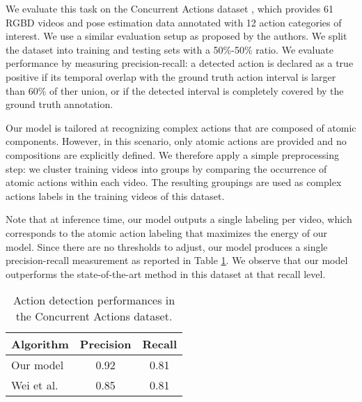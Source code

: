 We evaluate this task on the Concurrent Actions dataset \cite{Wei2013},
which
provides 61 RGBD videos and pose estimation data annotated with 12
action categories of interest.
We use a similar evaluation setup as proposed by the authors.
We split the dataset into training and testing sets with a 50\%-50\% ratio.
We evaluate performance by measuring precision-recall: a detected action
is declared as a true positive if its temporal overlap with the ground
truth action interval is larger than 60\% of ther union, or if
the detected interval is completely covered by the ground truth annotation.

Our model is tailored at recognizing complex actions that are composed
of atomic components. However, in this scenario, only atomic actions are
provided and no compositions are explicitly defined. We therefore apply
a simple preprocessing step: we cluster training videos into groups
by comparing the occurrence of atomic actions within each video.
The resulting groupings are used as complex actions labels in the training
videos of this dataset.

Note that at inference time, our model outputs a single labeling per video,
which corresponds to the atomic action labeling that maximizes the energy of
our model.
Since there are no thresholds to adjust, our model produces a single
precision-recall measurement as reported in Table \ref{tab:concurrent}.
We observe that our model outperforms the state-of-the-art method in this
dataset at that recall level.





\begin{table}
\footnotesize
\centering
\begin{tabular}{|l|c|c|}
\hline
\textbf{Algorithm} & \textbf{Precision} & \textbf{Recall}\\
\hline
Our model &  0.92 & 0.81 \\
\hline
Wei et al. \cite{Wei2013} & 0.85 & 0.81 \\
\hline
\end{tabular}
\caption{Action detection performances in the Concurrent Actions dataset. }
\label{tab:concurrent}
\end{table}
 
